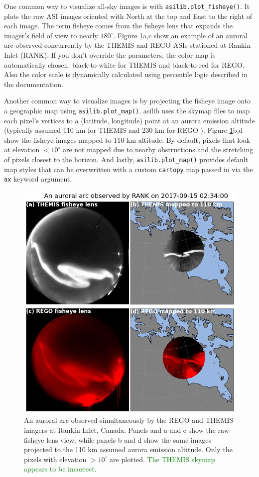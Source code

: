 \documentclass[draft]{agujournal2019}
\begin{document}
One common way to visualize all-sky images is with \verb|asilib.plot_fisheye()|. It plots the raw ASI images oriented with North at the top and East to the right of each image. The term fisheye comes from the fisheye lens that expands the imager's field of view to nearly $180^\circ$. Figure \ref{fig2}a,c show an example of an auroral arc observed concurrently by the THEMIS and REGO ASIs stationed at Rankin Inlet (RANK). If you don't override the parameters, the color map is automatically chosen: black-to-white for THEMIS and black-to-red for REGO. Also the color scale is dynamically calculated using percentile logic described in the documentation.

Another common way to visualize images is by projecting the fisheye image onto a geographic map using \verb|asilib.plot_map()|. asilib uses the skymap files to map each pixel's vertices to a (latitude, longitude) point at an aurora emission altitude (typically assumed 110 km for THEMIS and 230 km for REGO \cite{Donovan2006, Liang2016}). Figure \ref{fig2}b,d show the fisheye images mapped to 110 km altitude. By default, pixels that look at elevation $< 10^\circ$ are not mapped due to nearby obstructions and the stretching of pixels closest to the horizon. And lastly, \verb|asilib.plot_map()| provides default map styles that can be overwritten with a custom \verb|cartopy| \cite{Cartopy} map passed in via the \verb|ax| keyword argument.

\begin{figure}
      \includegraphics[width=\textwidth]{figures/fig2.png}
      \caption{An auroral arc observed simultaneously by the REGO and THEMIS imagers at Rankin Inlet, Canada. Panels and a and c show the raw fisheye lens view, while panels b and d show the same images projected to the 110 km assumed aurora emission altitude. Only the pixels with elevation $>10^\circ$ are plotted. \textcolor{green}{The THEMIS skymap appears to be incorrect.}}
      \label{fig2}
\end{figure}
\end{document}
